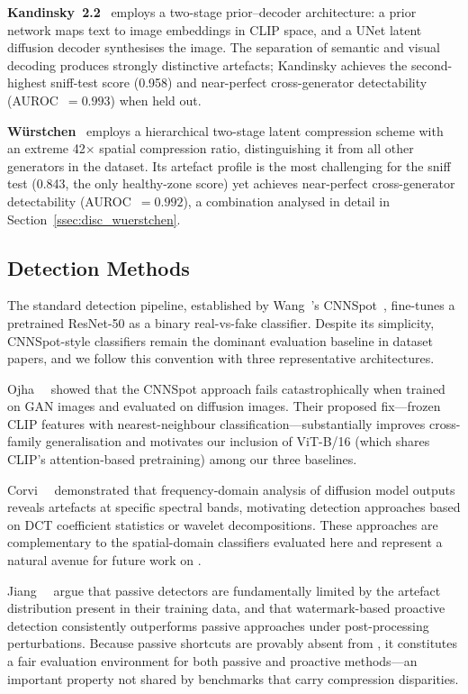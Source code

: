 \textbf{Kandinsky~2.2}~\cite{razzhigaev2023kandinsky} employs a
two-stage prior--decoder architecture: a prior network maps text
to image embeddings in CLIP space, and a UNet latent diffusion
decoder synthesises the image.
The separation of semantic and visual decoding produces strongly
distinctive artefacts; Kandinsky achieves the second-highest
sniff-test score (0.958) and near-perfect cross-generator
detectability (AUROC~$= 0.993$) when held out.

\textbf{W\"{u}rstchen}~\cite{pernias2023wuerstchen} employs a
hierarchical two-stage latent compression scheme with an extreme
42$\times$ spatial compression ratio, distinguishing it from
all other generators in the dataset.
Its artefact profile is the most challenging for the sniff test
(0.843, the only healthy-zone score) yet achieves near-perfect
cross-generator detectability (AUROC~$= 0.992$), a combination
analysed in detail in Section~\ref{ssec:disc_wuerstchen}.

\subsection{Detection Methods}
\label{ssec:detectors}

The standard detection pipeline, established by Wang~\etal's
CNNSpot~\cite{wang2020cnn}, fine-tunes a pretrained ResNet-50 as a
binary real-vs-fake classifier.
Despite its simplicity, CNNSpot-style classifiers remain the
dominant evaluation baseline in dataset papers, and we follow this
convention with three representative architectures.

Ojha~\etal~\cite{ojha2023universal} showed that the CNNSpot approach
fails catastrophically when trained on GAN images and evaluated on
diffusion images.
Their proposed fix---frozen CLIP features with nearest-neighbour
classification---substantially improves cross-family generalisation
and motivates our inclusion of ViT-B/16 (which shares CLIP's
attention-based pretraining) among our three baselines.

Corvi~\etal~\cite{corvi2023detection} demonstrated that frequency-domain
analysis of diffusion model outputs reveals artefacts at specific
spectral bands, motivating detection approaches based on DCT
coefficient statistics or wavelet decompositions.
These approaches are complementary to the spatial-domain classifiers
evaluated here and represent a natural avenue for future work on
\textbf{\datasetname}.

Jiang~\etal~\cite{jiang2024passive} argue that passive detectors are
fundamentally limited by the artefact distribution present in their
training data, and that watermark-based proactive detection
consistently outperforms passive approaches under post-processing
perturbations.
Because passive shortcuts are provably absent from \textbf{\datasetname},
it constitutes a fair evaluation environment for both passive and
proactive methods---an important property not shared by benchmarks
that carry compression disparities.

